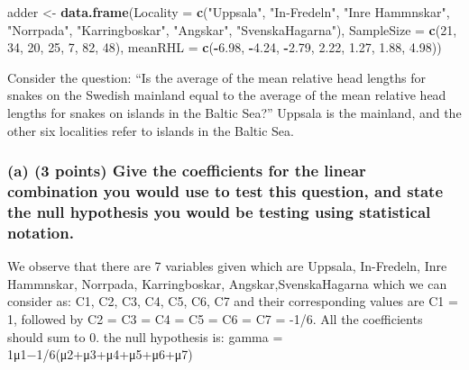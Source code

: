 \documentclass[]{article}
\newenvironment{Shaded}{\begin{snugshade}}{\end{snugshade}}
\newcommand{\KeywordTok}[1]{\textcolor[rgb]{0.13,0.29,0.53}{\textbf{#1}}}
\newcommand{\DataTypeTok}[1]{\textcolor[rgb]{0.13,0.29,0.53}{#1}}
\newcommand{\DecValTok}[1]{\textcolor[rgb]{0.00,0.00,0.81}{#1}}
\newcommand{\FloatTok}[1]{\textcolor[rgb]{0.00,0.00,0.81}{#1}}
\newcommand{\StringTok}[1]{\textcolor[rgb]{0.31,0.60,0.02}{#1}}
\newcommand{\OperatorTok}[1]{\textcolor[rgb]{0.81,0.36,0.00}{\textbf{#1}}}
\newcommand{\NormalTok}[1]{#1}
\begin{document}
\begin{Shaded}
\begin{Highlighting}[]
\NormalTok{adder <-}\StringTok{ }\KeywordTok{data.frame}\NormalTok{(}\DataTypeTok{Locality =} \KeywordTok{c}\NormalTok{(}\StringTok{"Uppsala"}\NormalTok{, }\StringTok{"In-Fredeln"}\NormalTok{, }\StringTok{"Inre Hammnskar"}\NormalTok{, }\StringTok{"Norrpada"}\NormalTok{,}
                                 \StringTok{"Karringboskar"}\NormalTok{, }\StringTok{"Angskar"}\NormalTok{, }\StringTok{"SvenskaHagarna"}\NormalTok{), }
                    \DataTypeTok{SampleSize =} \KeywordTok{c}\NormalTok{(}\DecValTok{21}\NormalTok{, }\DecValTok{34}\NormalTok{, }\DecValTok{20}\NormalTok{, }\DecValTok{25}\NormalTok{, }\DecValTok{7}\NormalTok{, }\DecValTok{82}\NormalTok{, }\DecValTok{48}\NormalTok{), }
                    \DataTypeTok{meanRHL =} \KeywordTok{c}\NormalTok{(}\OperatorTok{-}\FloatTok{6.98}\NormalTok{, }\OperatorTok{-}\FloatTok{4.24}\NormalTok{, }\OperatorTok{-}\FloatTok{2.79}\NormalTok{, }\FloatTok{2.22}\NormalTok{, }\FloatTok{1.27}\NormalTok{, }\FloatTok{1.88}\NormalTok{, }\FloatTok{4.98}\NormalTok{))}
\end{Highlighting}
\end{Shaded}

Consider the question: ``Is the average of the mean relative head
lengths for snakes on the Swedish mainland equal to the average of the
mean relative head lengths for snakes on islands in the Baltic Sea?''
Uppsala is the mainland, and the other six localities refer to islands
in the Baltic Sea.

\subsubsection{(a) (3 points) Give the coefficients for the linear
combination you would use to test this question, and state the null
hypothesis you would be testing using statistical
notation.}\label{a-3-points-give-the-coefficients-for-the-linear-combination-you-would-use-to-test-this-question-and-state-the-null-hypothesis-you-would-be-testing-using-statistical-notation.}

We observe that there are 7 variables given which are Uppsala,
In-Fredeln, Inre Hammnskar, Norrpada, Karringboskar,
Angskar,SvenskaHagarna which we can consider as: C1, C2, C3, C4, C5, C6,
C7 and their corresponding values are C1 = 1, followed by C2 = C3 = C4 =
C5 = C6 = C7 = -1/6. All the coefficients should sum to 0. the null
hypothesis is: gamma = 1μ1−1/6(μ2+μ3+μ4+μ5+μ6+μ7)
\end{document}
